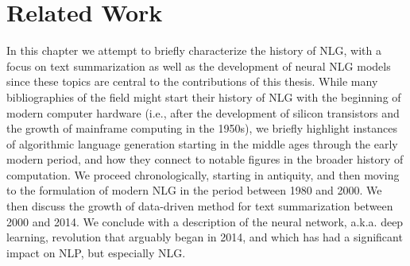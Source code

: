 \chapter{Related Work}
\label{ch:relwork}

In this chapter we attempt to briefly characterize the history of
NLG, with a focus on text summarization as well as the development of neural
NLG models since these topics are central to the contributions of this thesis.
While many bibliographies of the field might start their history of NLG with
the beginning of modern computer hardware (i.e., after the development of
silicon transistors and the growth of mainframe computing in the 1950s), we
briefly highlight instances of algorithmic language generation starting in the
middle ages through the early modern period, and how they connect to notable
figures in the broader history of computation.  We proceed chronologically,
starting in antiquity, and then moving to the formulation of modern NLG in the
period between 1980 and 2000. We then discuss the growth of data-driven method
for text summarization between 2000 and 2014.  We conclude with a description
of the neural network, a.k.a. deep learning, revolution that arguably began in
2014, and which has had a significant impact on NLP, but especially NLG. 

